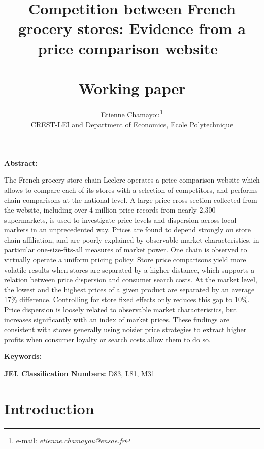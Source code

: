 \documentclass[english]{article}
\begin{document}
\title{Competition between French grocery stores: Evidence from a price comparison website\ \\ \ \\Working paper}
\author{Etienne Chamayou\thanks{e-mail:
\textit{etienne.chamayou@ensae.fr}}\medskip\\{\normalsize CREST-LEI and Department of Economics, Ecole Polytechnique }}
\maketitle

\sloppy%

\onehalfspacing

\textbf{Abstract:}

The French grocery store chain Leclerc operates a price comparison website which allows to compare each of its stores with a selection of competitors, and performs chain comparisons at the national level. A large price cross section collected from the website, including over 4 million price records from nearly 2,300 supermarkets, is used to investigate price levels and dispersion across local markets in an unprecedented way. Prices are found to depend strongly on store chain affiliation, and are poorly explained by observable market characteristics, in particular one-size-fits-all measures of market power. One chain is observed to virtually operate a uniform pricing policy. Store price comparisons yield more volatile results when stores are separated by a higher distance, which supports a relation between price dispersion and consumer search costs. At the market level, the lowest and the highest prices of a given product are separated by an average 17\% difference. Controlling for store fixed effects only reduces this gap to 10\%. Price dispersion is loosely related to observable market characteristics, but increases significantly with an index of market prices. These findings are consistent with stores generally using noisier price strategies to extract higher profits when consumer loyalty or search costs allow them to do so.

\strut

\textbf{Keywords:}

\strut

\textbf{JEL Classification Numbers:} D83, L81, M31

\pagebreak%

\section{Introduction}
\end{document}
